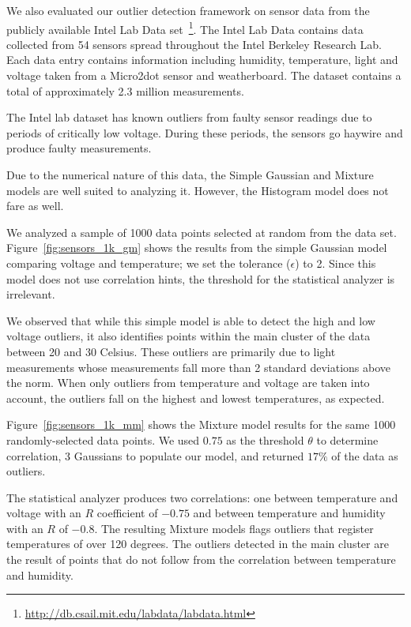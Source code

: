 
We also evaluated our outlier detection framework on sensor data from the publicly available Intel Lab Data set~\footnote{\url{http://db.csail.mit.edu/labdata/labdata.html}}. The Intel Lab Data contains data collected from 54 sensors spread throughout the Intel Berkeley Research Lab. Each data entry contains information including humidity, temperature, light and voltage taken from a Micro2dot sensor and weatherboard. The dataset contains a total of approximately 2.3 million measurements.

The Intel lab dataset has known outliers from faulty sensor readings due to periods of critically low voltage. During these periods, the sensors go haywire and produce faulty measurements.

Due to the numerical nature of this data, the Simple Gaussian and Mixture models are well suited to analyzing it. However, the Histogram model does not fare as well.

We analyzed a sample of 1000 data points selected at random from the data set. Figure~\ref{fig:sensors_1k_gm} shows the results from the simple Gaussian model comparing voltage and temperature; we set the tolerance ($\epsilon$) to 2. Since this model does not use correlation hints, the threshold for the statistical analyzer is irrelevant.

We observed that while this simple model is able to detect the high and low voltage outliers, it also identifies points within the main cluster of the data between 20 and 30 Celsius. These outliers are primarily due to light measurements whose measurements fall more than 2 standard deviations above the norm. When only outliers from temperature and voltage are taken into account, the outliers fall on the highest and lowest temperatures, as expected.

Figure~\ref{fig:sensors_1k_mm} shows the Mixture model results for the same 1000 randomly-selected data points. We used $0.75$ as the threshold $\theta$ to determine correlation, 3 Gaussians to populate our model, and returned $17\%$ of the data as outliers.

The statistical analyzer produces two correlations: one between temperature and voltage with an $R$ coefficient of $-0.75$ and between temperature and humidity with an $R$ of $-0.8$. The resulting Mixture models flags outliers that register temperatures of over 120 degrees. The outliers detected in the main cluster are the result of points that do not follow from the correlation between temperature and humidity.

